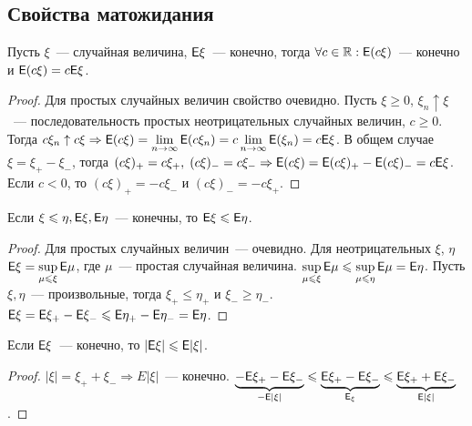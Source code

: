 \subsection{Свойства матожидания}
\begin{property}
	Пусть $\xi$~--- случайная величина, $\mathsf{E} \xi$~--- конечно, тогда $\forall c \in \mathbb{R} : \mathsf{E}(c\xi)$~--- конечно и $\mathsf{E}(c\xi) = c\mathsf{E}\xi$.
	\begin{proof}
		Для простых случайных величин свойство очевидно. Пусть $\xi \geqslant 0$, $\xi_n \uparrow \xi$~--- последовательность простых неотрицательных случайных величин, $c \geqslant 0$. Тогда $c\xi_n \uparrow c\xi \Rightarrow \mathsf{E}(c\xi) = \lim\limits_{n \rightarrow \infty} \mathsf{E}(c\xi_n) = c \lim\limits_{n \rightarrow \infty} \mathsf{E}(\xi_n) = c\mathsf{E}\xi$. В общем случае $\xi = \xi_+ - \xi_-$, тогда $(c\xi)_+ = c\xi_+,\; (c\xi)_- = c\xi_- \Rightarrow \mathsf{E}(c\xi) = \mathsf{E}(c\xi)_+ - \mathsf{E}(c\xi)_- = c\mathsf{E}\xi$. Если $c < 0$, то $(c\xi)_+ = -c\xi_-$ и $(c\xi)_- = -c\xi_+$.
	\end{proof}
\end{property}
\begin{property}
	Если $\xi \leqslant \eta, \mathsf{E} \xi, \mathsf{E} \eta$~--- конечны, то $\mathsf{E} \xi \leqslant \mathsf{E} \eta$.
	\begin{proof}
		Для простых случайных величин~--- очевидно. Для неотрицательных $\xi$, $\eta$ $\mathsf{E}\xi = \sup\limits_{\mu \leqslant \xi}\mathsf{E}\mu$, где $\mu$~--- простая случайная величина. $\sup\limits_{\mu \leqslant \xi}\mathsf{E}\mu \leqslant \sup\limits_{\mu \leqslant \eta}\mathsf{E}\mu = \mathsf{E}\eta$. Пусть $\xi, \eta$~--- произвольные, тогда $\xi_+ \leqslant \eta_+$ и $\xi_- \geqslant \eta_-$. $\mathsf{E}\xi = \mathsf{E}\xi_+ - \mathsf{E}\xi_- \leqslant \mathsf{E}\eta_+ - \mathsf{E}\eta_- = \mathsf{E}\eta$.
	\end{proof}
\end{property}
\begin{property}
	Если $\mathsf{E}\xi$~--- конечно, то $|\mathsf{E}\xi| \leqslant \mathsf{E}|\xi|$.
	\begin{proof}
		$|\xi| = \xi_+ + \xi_- \Rightarrow E|\xi|$~--- конечно. $\underbrace{-\mathsf{E}\xi_+ - \mathsf{E}\xi_-}_{-\mathsf{E}|\xi|} \leqslant \underbrace{\mathsf{E}\xi_+ - \mathsf{E}\xi_-}_{\mathsf{E}_\xi} \leqslant \underbrace{\mathsf{E}\xi_+ + \mathsf{E}\xi_-}_{\mathsf{E}|\xi|}$.
	\end{proof}
\end{property}
